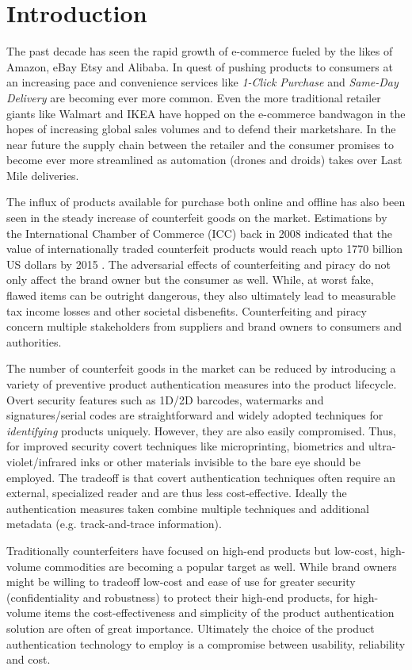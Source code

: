 \documentclass[thesis.tex]{subfiles}
\begin{document}
\chapter{Introduction}
\label{chapter:intro}

The past decade has seen the rapid growth of e-commerce fueled by the likes of Amazon, eBay Etsy and Alibaba. In quest of pushing products to consumers at an increasing pace and convenience services like \emph{1-Click Purchase} and \emph{Same-Day Delivery} are becoming ever more common. Even the more traditional retailer giants like Walmart and IKEA have hopped on the e-commerce bandwagon in the hopes of increasing global sales volumes and to defend their marketshare. In the near future the supply chain between the retailer and the consumer promises to become ever more streamlined as automation (drones and droids) takes over Last Mile deliveries.

The influx of products available for purchase both online and offline has also been seen in the steady increase of counterfeit goods on the market. Estimations by the International Chamber of Commerce (ICC) back in 2008 indicated that the value of internationally traded counterfeit products would reach upto 1770 billion US dollars by 2015 \cite{icc}. The adversarial effects of counterfeiting and piracy do not only affect the brand owner but the consumer as well. While, at worst fake, flawed items can be outright dangerous, they also ultimately lead to measurable tax income losses and other societal disbenefits. Counterfeiting and piracy concern multiple stakeholders from suppliers and brand owners to consumers and authorities.

The number of counterfeit goods in the market can be reduced by introducing a variety of preventive product authentication measures into the product lifecycle. Overt security features such as 1D/2D barcodes, watermarks and signatures/serial codes are straightforward and widely adopted techniques for \emph{identifying} products uniquely. However, they are also easily compromised. Thus, for improved security covert techniques like microprinting, biometrics and ultra-violet/infrared inks or other materials invisible to the bare eye should be employed. The tradeoff is that covert authentication techniques often require an external, specialized reader and are thus less cost-effective. Ideally the authentication measures taken combine multiple techniques and additional metadata (e.g. track-and-trace information).

Traditionally counterfeiters have focused on high-end products but low-cost, high-volume commodities are becoming a popular target as well. While brand owners might be willing to tradeoff low-cost and ease of use for greater security (confidentiality and robustness) to protect their high-end products, for high-volume items the cost-effectiveness and simplicity of the product authentication solution are often of great importance. Ultimately the choice of the product authentication technology to employ is a compromise between usability, reliability and cost.
\end{document}

